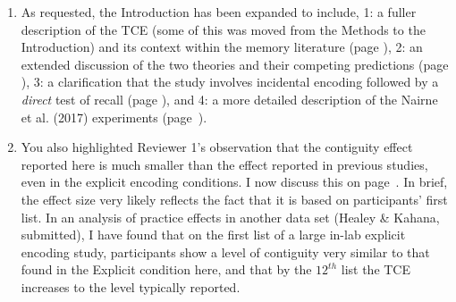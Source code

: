 \documentclass[12pt]{article}
\begin{document}
\begin{enumerate}

\item
	As requested, the Introduction has been expanded to include, 1: a fuller description of the TCE (some of this was moved from the Methods to the Introduction) and its context within the memory literature (page \pageref{TODO-1}), 2: %
	an extended discussion of the two theories and their competing predictions (page \pageref{TODO-2}),
	3: a clarification that the study involves incidental encoding followed by a \emph{direct} test of recall (page \pageref{TODO-3}), and 4:
	a more detailed description of the Nairne et al. (2017) experiments (page~\pageref{TODO-4}).

\item
	You also highlighted Reviewer 1's observation that the contiguity effect reported here is much smaller than the effect reported in previous studies, even in the explicit encoding conditions. I now discuss this on page~\pageref{TODO-5}. In brief, the effect size very likely reflects the fact that it is based on participants' first list. In an analysis of practice effects in another data set (Healey \& Kahana, submitted), I have found that on the first list of a large in-lab explicit encoding study, participants show a level of contiguity very similar to that found in the Explicit condition here, and that by the $12^{th}$ list the TCE increases to the level typically reported.


\end{enumerate}
\end{document}
